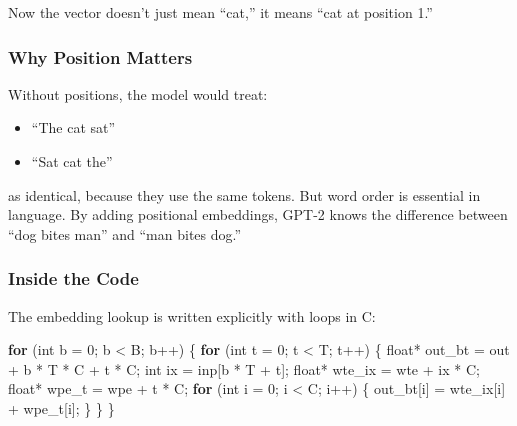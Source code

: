 \documentclass[
  letterpaper,
  DIV=11,
  numbers=noendperiod]{scrreprt}
\newenvironment{Shaded}{\begin{snugshade}}{\end{snugshade}}
\newcommand{\ControlFlowTok}[1]{\textcolor[rgb]{0.00,0.23,0.31}{\textbf{#1}}}
\newcommand{\DataTypeTok}[1]{\textcolor[rgb]{0.68,0.00,0.00}{#1}}
\newcommand{\DecValTok}[1]{\textcolor[rgb]{0.68,0.00,0.00}{#1}}
\newcommand{\NormalTok}[1]{\textcolor[rgb]{0.00,0.23,0.31}{#1}}
\newcommand{\OperatorTok}[1]{\textcolor[rgb]{0.37,0.37,0.37}{#1}}
\providecommand{\tightlist}{%
  \setlength{\itemsep}{0pt}\setlength{\parskip}{0pt}}
\begin{document}
Now the vector doesn't just mean ``cat,'' it means ``cat at position
1.''

\subsubsection{Why Position Matters}\label{why-position-matters}

Without positions, the model would treat:

\begin{itemize}
\tightlist
\item
  ``The cat sat''
\item
  ``Sat cat the''
\end{itemize}

as identical, because they use the same tokens. But word order is
essential in language. By adding positional embeddings, GPT-2 knows the
difference between ``dog bites man'' and ``man bites dog.''

\subsubsection{Inside the Code}\label{inside-the-code}

The embedding lookup is written explicitly with loops in C:

\begin{Shaded}
\begin{Highlighting}[]
\ControlFlowTok{for} \OperatorTok{(}\DataTypeTok{int}\NormalTok{ b }\OperatorTok{=} \DecValTok{0}\OperatorTok{;}\NormalTok{ b }\OperatorTok{\textless{}}\NormalTok{ B}\OperatorTok{;}\NormalTok{ b}\OperatorTok{++)} \OperatorTok{\{}
    \ControlFlowTok{for} \OperatorTok{(}\DataTypeTok{int}\NormalTok{ t }\OperatorTok{=} \DecValTok{0}\OperatorTok{;}\NormalTok{ t }\OperatorTok{\textless{}}\NormalTok{ T}\OperatorTok{;}\NormalTok{ t}\OperatorTok{++)} \OperatorTok{\{}
        \DataTypeTok{float}\OperatorTok{*}\NormalTok{ out\_bt }\OperatorTok{=}\NormalTok{ out }\OperatorTok{+}\NormalTok{ b }\OperatorTok{*}\NormalTok{ T }\OperatorTok{*}\NormalTok{ C }\OperatorTok{+}\NormalTok{ t }\OperatorTok{*}\NormalTok{ C}\OperatorTok{;}
        \DataTypeTok{int}\NormalTok{ ix }\OperatorTok{=}\NormalTok{ inp}\OperatorTok{[}\NormalTok{b }\OperatorTok{*}\NormalTok{ T }\OperatorTok{+}\NormalTok{ t}\OperatorTok{];}
        \DataTypeTok{float}\OperatorTok{*}\NormalTok{ wte\_ix }\OperatorTok{=}\NormalTok{ wte }\OperatorTok{+}\NormalTok{ ix }\OperatorTok{*}\NormalTok{ C}\OperatorTok{;}
        \DataTypeTok{float}\OperatorTok{*}\NormalTok{ wpe\_t }\OperatorTok{=}\NormalTok{ wpe }\OperatorTok{+}\NormalTok{ t }\OperatorTok{*}\NormalTok{ C}\OperatorTok{;}
        \ControlFlowTok{for} \OperatorTok{(}\DataTypeTok{int}\NormalTok{ i }\OperatorTok{=} \DecValTok{0}\OperatorTok{;}\NormalTok{ i }\OperatorTok{\textless{}}\NormalTok{ C}\OperatorTok{;}\NormalTok{ i}\OperatorTok{++)} \OperatorTok{\{}
\NormalTok{            out\_bt}\OperatorTok{[}\NormalTok{i}\OperatorTok{]} \OperatorTok{=}\NormalTok{ wte\_ix}\OperatorTok{[}\NormalTok{i}\OperatorTok{]} \OperatorTok{+}\NormalTok{ wpe\_t}\OperatorTok{[}\NormalTok{i}\OperatorTok{];}
        \OperatorTok{\}}
    \OperatorTok{\}}
\OperatorTok{\}}
\end{Highlighting}
\end{Shaded}
\end{document}

